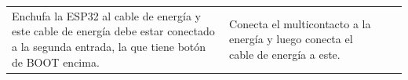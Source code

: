 \begin{center}
\begin{tabular}{ |p{4cm}|p{4cm}|p{4cm}|p{4cm}| }
\hline

&&&\\

\hline
 Enchufa la ESP32 al cable de energía y este cable de energía debe estar conectado a la segunda entrada, la que tiene botón de BOOT encima.
 &  Conecta el multicontacto a la energía y luego conecta el cable de energía a este. 
 & & \\
\hline

\end{tabular}

\end{center}


